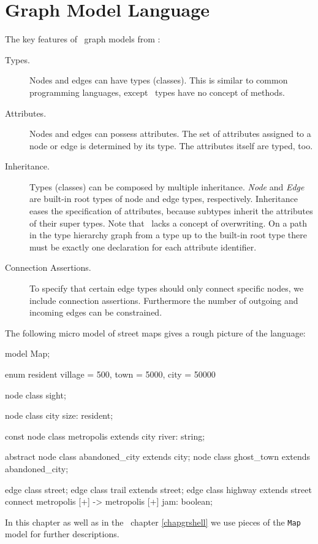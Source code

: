 \chapter{Graph Model Language}
\label{chapmodellang}
The key features of \GrG\ graph models from \cite{geiss}:

\begin{description}
\item[Types.] Nodes and edges can have types (classes). This is similar to common programming languages, except \GrG\ types have no concept of methods. 
\item[Attributes.] Nodes and edges can possess attributes. The set of attributes assigned to a node or edge is determined by its type. The attributes itself are typed, too.
\item[Inheritance.] Types (classes) can be composed by multiple inheritance. \emph{Node} and \emph{Edge} are built-in root types of node and edge types, respectively. Inheritance eases the specification of attributes, because subtypes inherit the attributes of their super types. Note that \GrG\ lacks a concept of overwriting. On a path in the type hierarchy graph from a type up to the built-in root type there must be exactly one declaration for each attribute identifier.
\item[Connection Assertions.] To specify that certain edge types should only connect specific nodes, we include connection assertions. Furthermore the number of outgoing and incoming edges can be constrained.
\end{description}
The following micro model of street maps gives a rough picture of the language:
\begin{grgen}
model Map;

enum resident {village = 500, town = 5000, city = 50000}

node class sight;

node class city {
	size: resident;
}

const node class metropolis extends city {
  river: string;
}  

abstract node class abandoned_city extends city;
node class ghost_town extends abandoned_city;

edge class street;
edge class trail extends street;
edge class highway extends street
    connect metropolis [+] -> metropolis [+]
{
    jam: boolean;
}
\end{grgen}
In this chapter as well as in the \GrShell\ chapter \ref{chapgrshell} we use pieces of the \texttt{Map} model for further descriptions.

